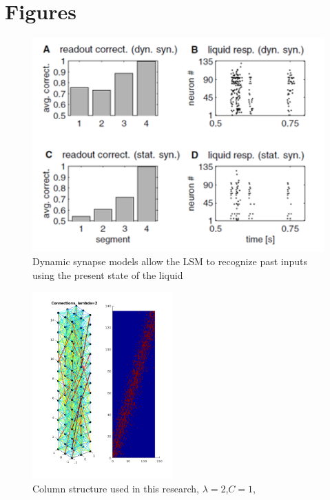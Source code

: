 \documentclass[a4paper,11pt]{article}
\begin{document}
\section{Figures}
\begin{figure}[p]
 \caption{Dynamic synapse models allow the LSM to recognize past inputs using the present state of the liquid \cite{maas2002}}
 \label{fig:lsm_memory}
 \centering
   \includegraphics[width=\textwidth]{fig/maas_memory}
\end{figure}

\begin{figure}[p]
 \caption{Column structure used in this research, $\lambda=2$,$C=1$,}
 \centering
   \includegraphics[width=0.48\textwidth]{fig/lambda2}
\end{figure}
\end{document}
